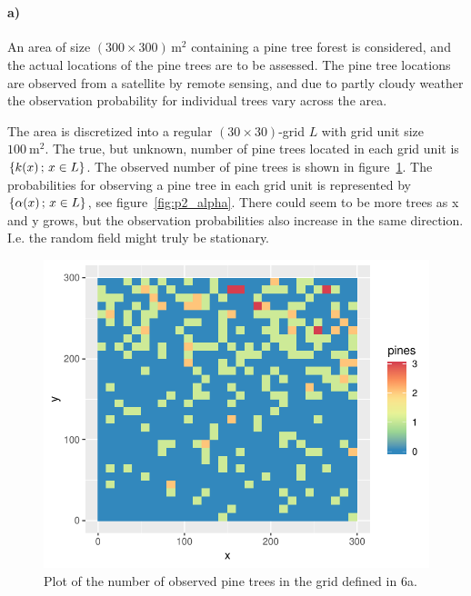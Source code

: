 \section{}
\label{sec:problem2}

\paragraph{a)}
An area of size $(300 \times 300) \, \si{\meter^2}$ containing a pine tree forest is considered, and the actual locations of the pine trees are to be assessed. The pine tree locations are observed from a satellite by remote sensing, and due to partly cloudy weather the observation probability for individual trees vary across the area.

The area is discretized into a regular $(30 \times 30)$-grid $L$ with grid unit size $\SI{100}{\meter^2}$. The true, but unknown, number of pine trees located in each grid unit is $\{k(x) \,;\, x \in L\}$. The observed number of pine trees is shown in figure~\ref{fig:p2_pines}. The probabilities for observing a pine tree in each grid unit is represented by $\{\alpha(x) \,;\, x \in L\}$, see figure~\ref{fig:p2_alpha}. There could seem to be more trees as x and y grows, but the observation probabilities also increase in the same direction. I.e. the random field might truly be stationary.

\begin{figure}
    \centering
    \includegraphics{figures/p2_pines.pdf}
    \caption{Plot of the number of observed pine trees in the grid defined in 6a.}
    \label{fig:p2_pines}
\end{figure}

